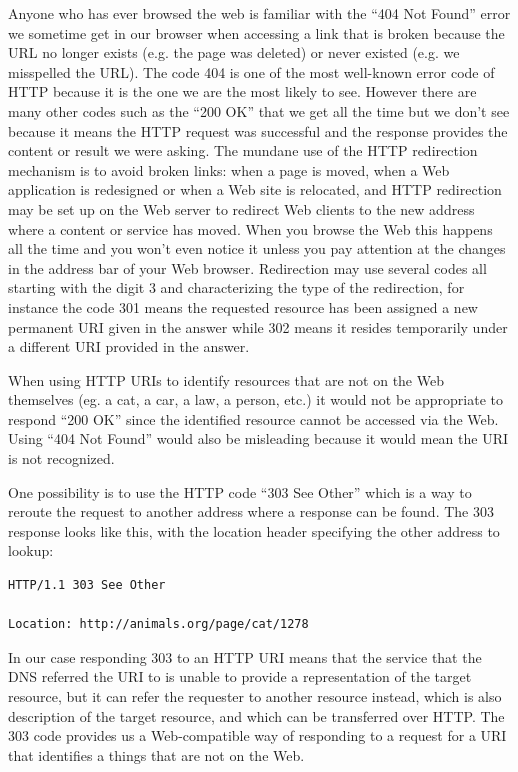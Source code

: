 Anyone who has ever browsed the web is familiar with the ``404 Not Found'' error we sometime 
get in our browser
when accessing a link that is broken because the URL no longer exists
(e.g. the page was deleted) or never existed (e.g. we misspelled the
URL). The code 404 is one of the most well-known error code of HTTP
because it is the one we are the most likely to see. However there are
many other codes such as the ``200 OK'' that we get all the time but we
don't see because it means the HTTP request was successful and the
response provides the content or result we were asking. The mundane use
of the HTTP redirection mechanism is to avoid broken links: when a page
is moved, when a Web application is redesigned or when a Web site is
relocated, and HTTP redirection may be set up on the Web server to
redirect Web clients to the new address where a content or service has
moved. When you browse the Web this happens all the time and you won't
even notice it unless you pay attention at the changes in the address
bar of your Web browser. Redirection may use several codes all starting
with the digit 3 and characterizing the type of the redirection, for
instance the code 301 means the requested resource has been assigned a
new permanent URI given in the answer while 302 means it resides
temporarily under a different URI provided in the answer.

When using HTTP URIs to identify resources that are not on the Web
themselves (eg. a cat, a car, a law, a person, etc.) it would not be
appropriate to respond ``200 OK'' since the identified resource cannot
be accessed via the Web. Using ``404 Not Found'' would also be
misleading because it would mean the URI is not recognized.

One possibility is to use the HTTP code ``303 See Other'' which is a way
to reroute the request to another address where a response can be found.
The 303 response looks like this, with the location header specifying
the other address to lookup:

\begin{lstlisting}
HTTP/1.1 303 See Other

Location: http://animals.org/page/cat/1278
\end{lstlisting}


In our case responding 303 to an HTTP URI means that the service that the DNS 
referred the URI to is unable to provide a representation of the target resource, but
it can refer the requester to another resource instead, which 
is also description of the target resource, and which can be
transferred over HTTP. The 303 code provides us a Web-compatible way of
responding to a request for a URI that identifies a things that are not
on the Web.

